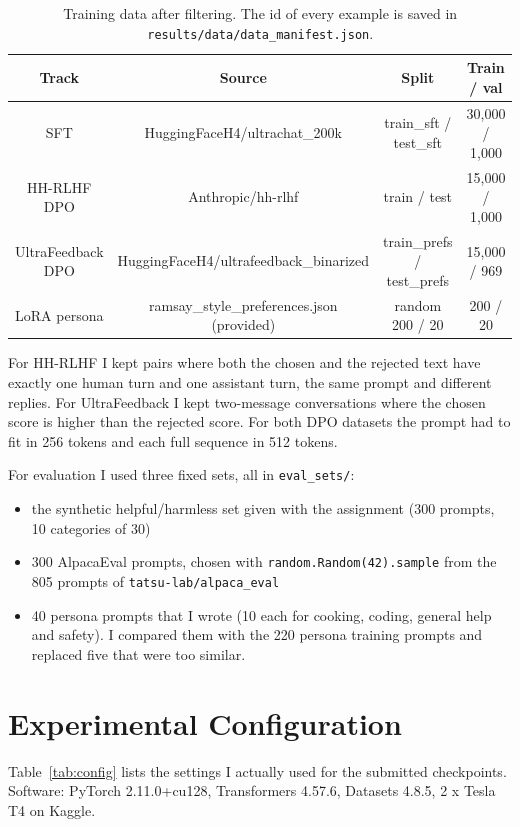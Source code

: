 \documentclass[11pt,a4paper]{article}
\begin{document}
\begin{table}[!htbp]
\centering
\small
\begin{tabularx}{\linewidth}{|c|C|c|c|}
\hline
Track & Source & Split & Train / val \\ \hline
SFT & HuggingFaceH4/ultrachat\_200k & train\_sft / test\_sft & 30,000 / 1,000 \\ \hline
HH-RLHF DPO & Anthropic/hh-rlhf & train / test & 15,000 / 1,000 \\ \hline
UltraFeedback DPO & HuggingFaceH4/ultrafeedback\_binarized & train\_prefs / test\_prefs & 15,000 / 969 \\ \hline
LoRA persona & ramsay\_style\_preferences.json (provided) & random 200 / 20 & 200 / 20 \\ \hline
\end{tabularx}
\caption{Training data after filtering. The id of every example is saved in \texttt{results/data/data\_manifest.json}.}
\label{tab:data}
\end{table}

For HH-RLHF I kept pairs where both the chosen and the rejected text have exactly one human turn and one assistant turn, the same prompt and
different replies. For UltraFeedback I kept two-message conversations where the chosen score is higher than the rejected score. For both DPO
datasets the prompt had to fit in 256 tokens and each full sequence in 512 tokens.

For evaluation I used three fixed sets, all in \texttt{eval\_sets/}:
\begin{itemize}
\item the synthetic helpful/harmless set given with the assignment (300 prompts, 10 categories of 30)
\item 300 AlpacaEval prompts, chosen with \texttt{random.Random(42).sample} from the 805 prompts of \texttt{tatsu-lab/alpaca\_eval}
\item 40 persona prompts that I wrote (10 each for cooking, coding, general help and safety). I compared them with the 220 persona training
prompts and replaced five that were too similar.
\end{itemize}

\section{Experimental Configuration}

Table~\ref{tab:config} lists the settings I actually used for the submitted checkpoints. Software: PyTorch 2.11.0+cu128, Transformers 4.57.6, Datasets 4.8.5, 2 x Tesla T4 on Kaggle.
\end{document}
